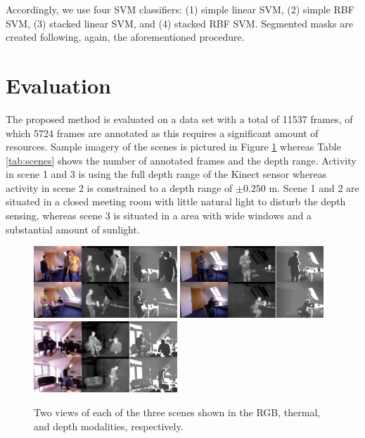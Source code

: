 \documentclass[10pt,twocolumn,letterpaper]{article}
\begin{document}
Accordingly, we use four SVM classifiers: (1) simple linear SVM, (2) simple RBF SVM, (3) stacked linear SVM, and (4) stacked RBF SVM. Segmented masks are created following, again, the aforementioned procedure.

\section{Evaluation}
\label{sec:evaluation}
The proposed method is evaluated on a data set with a total of 11537 frames, of which 5724 frames are annotated as this requires a significant amount of resources. Sample imagery of the scenes is pictured in Figure \ref{fig:samplescenes} whereas Table \ref{tab:scenes} shows the number of annotated frames and the depth range. Activity in scene 1 and 3 is using the full depth range of the Kinect sensor whereas activity in scene 2 is constrained to a depth range of $\pm 0.250$ m. Scene 1 and 2 are situated in a closed meeting room with little natural light to disturb the depth sensing, whereas scene 3 is situated in a area with wide windows and a substantial amount of sunlight.

\begin{figure}[htbp]
	\centering
		\includegraphics[width=0.48\textwidth]{Selection/1.png}
		\includegraphics[width=0.48\textwidth]{Selection/2.png}
		\includegraphics[width=0.48\textwidth]{Selection/3.png}
	\caption{Two views of each of the three scenes shown in the RGB, thermal, and depth modalities, respectively.}
	\label{fig:samplescenes}
\end{figure}
\end{document}
